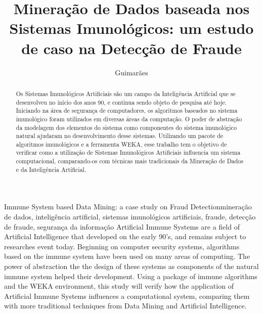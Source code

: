 \documentclass{iiufrgs}
\title{Mineração de Dados baseada nos Sistemas Imunológicos: um estudo de caso na Detecção de Fraude}
\author{Guimarães}{Bruno Barcarol}
\begin{document}
\maketitle

\tableofcontents

\listoffigures

\begin{abstract}
    Os Sistemas Imunológicos Artificiais são um campo da Inteligência Artificial que se desenvolveu no início dos anos 90, e continua sendo objeto de pesquisa até hoje. Iniciando na área de segurança de computadores, os algoritmos baseados no sistema imunológico foram utilizados em diversas áreas da computação. O poder de abstração da modelagem dos elementos do sistema como componentes do sistema imunológico natural ajudaram no desenvolvimento desse sistemas. Utilizando um pacote de algoritmos imunológicos e a ferramenta WEKA, esse trabalho tem o objetivo de verificar como a utilização de Sistemas Imunológicos Artificiais influencia um sistema computacional, comparando-os com técnicas mais tradicionais da Mineração de Dados e da Inteligência Artificial.
\end{abstract}

\begin{englishabstract}{Immune System based Data Mining: a case study on Fraud Detection}{mineração de dados, inteligência artificial, sistemas imunológicos artificiais, fraude, detecção de fraude, segurança da informação}
    Artificial Immune Systems are a field of Artificial Intelligence that developed on the early 90's, and remains subject to researches event today. Beginning on computer security systems, algorithms based on the immune system have been used on many areas of computing. The power of abstraction the the design of these systems as components of the natural immune system helped their development. Using a package of immune algorithms and the WEKA environment, this study will verify how the application of Artificial Immune Systems influences a computational system, comparing them with more traditional techniques from Data Mining and Artificial Intelligence.
\end{englishabstract}










\end{document}
